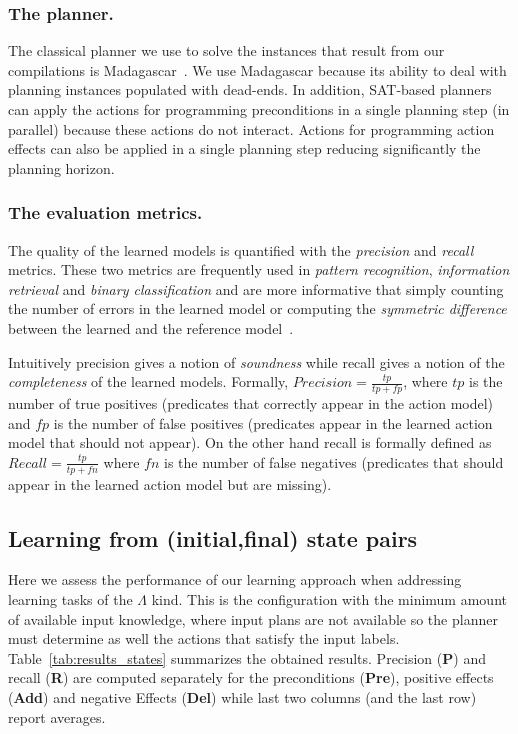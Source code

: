 \documentclass[letterpaper]{article} %
\begin{document}
\subsubsection{The planner.}
The classical planner we use to solve the instances that result from our compilations is {\sc Madagascar}~\cite{rintanen2014madagascar}. We use {\sc Madagascar} because its ability to deal with planning instances populated with dead-ends. In addition, SAT-based planners can apply the actions for programming preconditions in a single planning step (in parallel) because these actions do not interact. Actions for programming action effects can also be applied in a single planning step reducing significantly the planning horizon.

\subsubsection{The evaluation metrics.}
The quality of the learned models is quantified with the {\em precision} and {\em recall} metrics. These two metrics are frequently used in {\em pattern recognition}, {\em information retrieval} and {\em binary classification} and are more informative that simply counting the number of errors in the learned model or computing the {\em symmetric difference} between the learned and the reference model~\cite{davis2006relationship}.

Intuitively precision gives a notion of {\em soundness} while recall gives a notion of the {\em completeness} of the learned models. Formally, $Precision=\frac{tp}{tp+fp}$, where $tp$ is the number of true positives (predicates that correctly appear in the action model) and $fp$ is the number of false positives (predicates appear in the learned action model that should not appear). On the other hand recall is formally defined as $Recall=\frac{tp}{tp+fn}$ where $fn$ is the number of false negatives (predicates that should appear in the learned action model but are missing).

\subsection{Learning from (initial,final) state pairs}
Here we assess the performance of our learning approach when addressing learning tasks of the $\Lambda$ kind. This is the configuration with the minimum amount of available input knowledge, where input plans are not available so the planner must determine as well the actions that satisfy the input labels. Table~\ref{tab:results_states} summarizes the obtained results. Precision ({\bf P}) and recall ({\bf R}) are computed separately for the preconditions ({\bf Pre}), positive effects ({\bf Add}) and negative Effects ({\bf Del}) while last two columns (and the last row) report averages.
\end{document}
